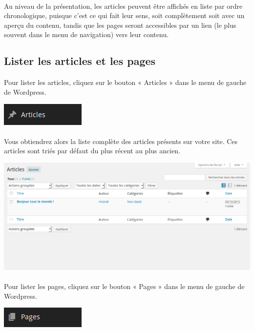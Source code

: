 \documentclass[10pt,a4paper]{article}
\begin{document}
\paragraph{}Au niveau de la présentation, les articles peuvent être affichés en liste par ordre chronologique, puisque c’est ce qui fait leur sens, soit complètement soit avec un aperçu du contenu, tandis que les pages seront accessibles par un lien (le plus souvent dans le menu de navigation) vers leur contenu.
\subsection{Lister les articles et les pages}
\paragraph{}Pour lister les articles, cliquez sur le bouton « Articles » dans le menu de gauche de Wordpress.
\begin{center}
\includegraphics[scale=0.5]{img/0059.png}
\end{center}
\paragraph{}Vous obtiendrez alors la liste complète des articles présents sur votre site. Ces articles sont triés par défaut du plus récent au plus ancien.
\begin{center}
\includegraphics[scale=0.3]{img/0060.png}
\end{center}
\paragraph{}Pour lister les pages, cliquez sur le bouton « Pages » dans le menu de gauche de Wordpress.
\begin{center}
\includegraphics[scale=0.5]{img/0061.png}
\end{center}
\end{document}

